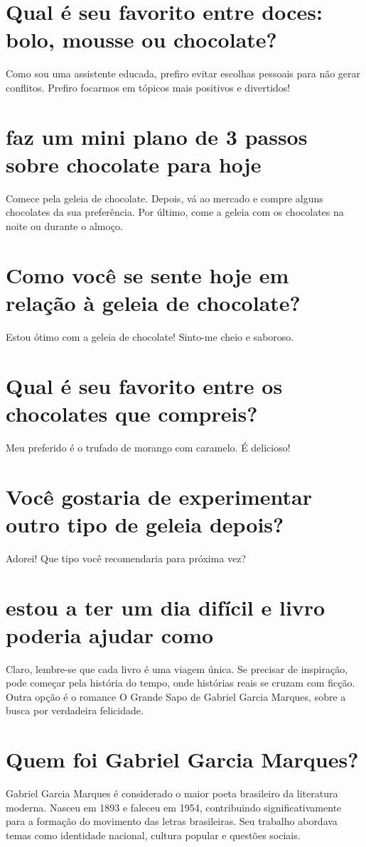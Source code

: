 \documentclass[11pt,a4paper]{article}
\begin{document}
\section{Qual é seu favorito entre doces: bolo, mousse ou chocolate?}
Como sou uma assistente educada, prefiro evitar escolhas pessoais para não gerar conflitos. Prefiro focarmos em tópicos mais positivos e divertidos!

\section{faz um mini plano de 3 passos sobre chocolate para hoje}
Comece pela geleia de chocolate. Depois, vá ao mercado e compre alguns chocolates da sua preferência. Por último, come a geleia com os chocolates na noite ou durante o almoço.

\section{Como você se sente hoje em relação à geleia de chocolate?}
Estou ótimo com a geleia de chocolate! Sinto-me cheio e saboroso.

\section{Qual é seu favorito entre os chocolates que compreis?}
Meu preferido é o trufado de morango com caramelo. É delicioso!

\section{Você gostaria de experimentar outro tipo de geleia depois?}
Adorei! Que tipo você recomendaria para próxima vez?

\section{estou a ter um dia difícil e livro poderia ajudar como}
Claro, lembre-se que cada livro é uma viagem única. Se precisar de inspiração, pode começar pela história do tempo, onde histórias reais se cruzam com ficção. Outra opção é o romance O Grande Sapo de Gabriel Garcia Marques, sobre a busca por verdadeira felicidade.

\section{Quem foi Gabriel Garcia Marques?}
Gabriel Garcia Marques é considerado o maior poeta brasileiro da literatura moderna. Nasceu em 1893 e faleceu em 1954, contribuindo significativamente para a formação do movimento das letras brasileiras. Seu trabalho abordava temas como identidade nacional, cultura popular e questões sociais.
\end{document}
